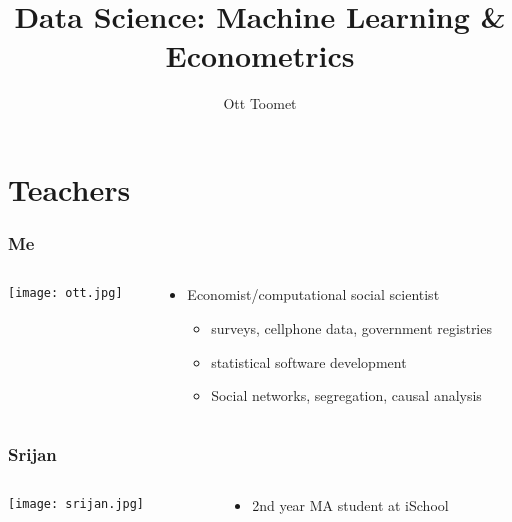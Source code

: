 \documentclass[mathserif, xcolor=table, svgnames]{beamer}
\title[INFX 574]{Data Science: Machine Learning \& Econometrics}
\author{Ott Toomet}
\begin{document}
\lstset{language=Python}

\begin{frame}
  \maketitle
\end{frame}

\begin{frame}
  \tableofcontents
\end{frame}

\section{Teachers}

\begin{frame}
  \frametitle{Me}
  \begin{columns}
    \begin{column}{0.5\linewidth}
      \begin{block}{}
        \texttt{[image: ott.jpg]}
      \end{block}
    \end{column}
    \begin{column}{0.5\linewidth}
      \begin{itemize}
      \item Economist/computational social scientist
        \begin{itemize}
        \item surveys, cellphone data, government registries
        \item statistical software development
        \item Social networks, segregation, causal analysis
        \end{itemize}
      \end{itemize}
    \end{column}
  \end{columns}
\end{frame}

\begin{frame}
  \frametitle{Srijan}
  \begin{columns}
    \begin{column}{0.5\linewidth}
      \begin{block}{}
        \texttt{[image: srijan.jpg]}
      \end{block}
    \end{column}
    \begin{column}{0.5\linewidth}
      \begin{itemize}
      \item 2nd year MA student at iSchool
      \end{itemize}
    \end{column}
  \end{columns}
\end{frame}
\end{document}
